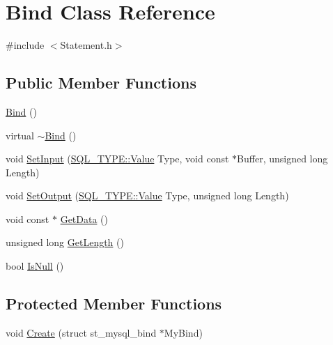 \hypertarget{class_bind}{}\section{Bind Class Reference}
\label{class_bind}


{\ttfamily \#include $<$Statement.\+h$>$}

\subsection*{Public Member Functions}
\begin{DoxyCompactItemize}
\item 
\hyperlink{class_bind_a375a86fb5ed134c1efbe962ebbfb3438}{Bind} ()
\item 
virtual \hyperlink{class_bind_a048901534135494cc4028db67168e3d3}{$\sim$\+Bind} ()
\item 
void \hyperlink{class_bind_a29531ab84e495311ef5b99368cc9d439}{Set\+Input} (\hyperlink{struct_s_q_l___t_y_p_e_a2ad43c0413d655b655c3b5ca694d1963}{S\+Q\+L\+\_\+\+T\+Y\+P\+E\+::\+Value} Type, void const $\ast$Buffer, unsigned long Length)
\item 
void \hyperlink{class_bind_aef30a42e1e5d65d1cee929a12aa34e29}{Set\+Output} (\hyperlink{struct_s_q_l___t_y_p_e_a2ad43c0413d655b655c3b5ca694d1963}{S\+Q\+L\+\_\+\+T\+Y\+P\+E\+::\+Value} Type, unsigned long Length)
\item 
void const $\ast$ \hyperlink{class_bind_a9dd755bde0d7c5ab532168d04d68151e}{Get\+Data} ()
\item 
unsigned long \hyperlink{class_bind_af56024d975f5fc2829241f9b1b220a58}{Get\+Length} ()
\item 
bool \hyperlink{class_bind_affbf612b9398e0c09b562824c3b4235c}{Is\+Null} ()
\end{DoxyCompactItemize}
\subsection*{Protected Member Functions}
\begin{DoxyCompactItemize}
\item 
void \hyperlink{class_bind_a097a2622756ecbc58096a167f6d49444}{Create} (struct st\+\_\+mysql\+\_\+bind $\ast$My\+Bind)
\end{DoxyCompactItemize}
